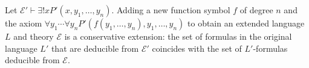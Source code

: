 Let $\mathcal{E}' \vdash \exists!x P'(x, y_1, \ldots, y_n)$. Adding a new function symbol $f$ of degree $n$ and the axiom $\forall y_1 \cdots \forall y_n P'(f(y_1,\ldots,y_n), y_1,\ldots,y_n)$ to obtain an extended language $L$ and theory $\mathcal{E}$ is a conservative extension: the set of formulas in the original language $L'$ that are deducible from $\mathcal{E}'$ coincides with the set of $L'$-formulas deducible from $\mathcal{E}$.
